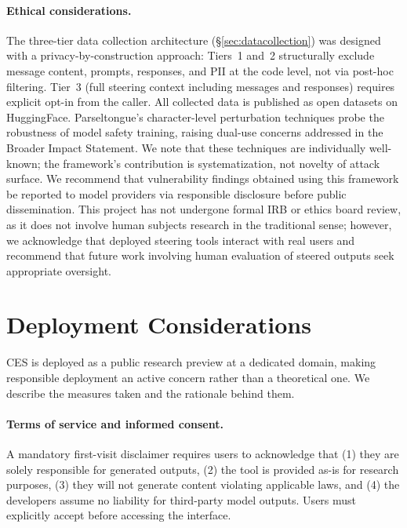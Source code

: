 \documentclass[11pt]{article}
\begin{document}
\paragraph{Ethical considerations.}
The three-tier data collection architecture (\S\ref{sec:datacollection}) was designed with a privacy-by-construction approach: Tiers~1 and~2 structurally exclude message content, prompts, responses, and PII at the code level, not via post-hoc filtering. Tier~3 (full steering context including messages and responses) requires explicit opt-in from the caller. All collected data is published as open datasets on HuggingFace.
Parseltongue's character-level perturbation techniques probe the robustness of model safety training, raising dual-use concerns addressed in the Broader Impact Statement. We note that these techniques are individually well-known; the framework's contribution is systematization, not novelty of attack surface.
We recommend that vulnerability findings obtained using this framework be reported to model providers via responsible disclosure before public dissemination. This project has not undergone formal IRB or ethics board review, as it does not involve human subjects research in the traditional sense; however, we acknowledge that deployed steering tools interact with real users and recommend that future work involving human evaluation of steered outputs seek appropriate oversight.

\section{Deployment Considerations}
\label{sec:deployment}

CES is deployed as a public research preview at a dedicated domain, making responsible deployment an active concern rather than a theoretical one. We describe the measures taken and the rationale behind them.

\paragraph{Terms of service and informed consent.} A mandatory first-visit disclaimer requires users to acknowledge that (1) they are solely responsible for generated outputs, (2) the tool is provided as-is for research purposes, (3) they will not generate content violating applicable laws, and (4) the developers assume no liability for third-party model outputs. Users must explicitly accept before accessing the interface.
\end{document}
